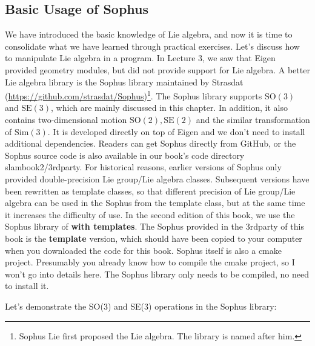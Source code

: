 \subsection{Basic Usage of Sophus}
We have introduced the basic knowledge of Lie algebra, and now it is time to consolidate what we have learned through practical exercises. Let's discuss how to manipulate Lie algebra in a program. In Lecture 3, we saw that Eigen provided geometry modules, but did not provide support for Lie algebra. A better Lie algebra library is the Sophus library maintained by Strasdat (\url{https://github.com/strasdat/Sophus})\footnote{Sophus Lie first proposed the Lie algebra. The library is named after him.}. The Sophus library supports $\mathrm{SO}(3)$ and $\mathrm{SE}(3)$, which are mainly discussed in this chapter. In addition, it also contains two-dimensional motion $\mathrm{SO}(2), \mathrm{SE} (2) $ and the similar transformation of $\mathrm{Sim}(3)$. It is developed directly on top of Eigen and we don't need to install additional dependencies. Readers can get Sophus directly from GitHub, or the Sophus source code is also available in our book's code directory slambook2/3rdparty. For historical reasons, earlier versions of Sophus only provided double-precision Lie group/Lie algebra classes. Subsequent versions have been rewritten as template classes, so that different precision of Lie group/Lie algebra can be used in the Sophus from the template class, but at the same time it increases the difficulty of use. In the second edition of this book, we use the Sophus library of \textbf{with templates}. The Sophus provided in the 3rdparty of this book is the \textbf{template} version, which should have been copied to your computer when you downloaded the code for this book. Sophus itself is also a cmake project. Presumably you already know how to compile the cmake project, so I won't go into details here. The Sophus library only needs to be compiled, no need to install it.

Let's demonstrate the SO(3) and SE(3) operations in the Sophus library:

